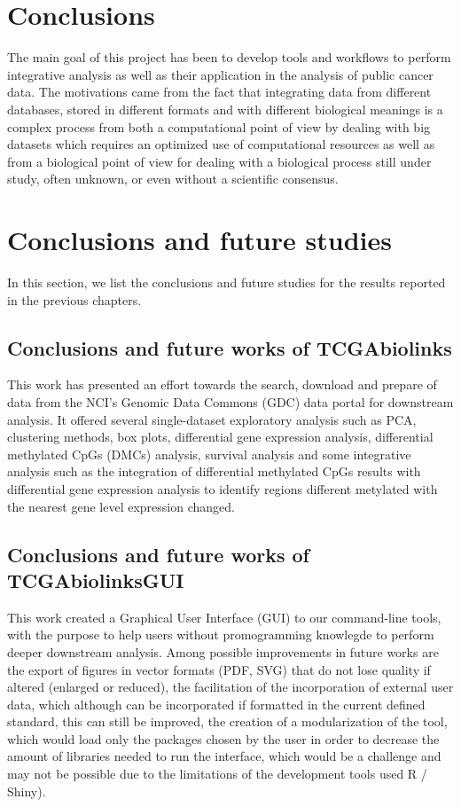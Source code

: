 \section{Conclusions}


The main goal of this project has been to develop tools and workflows to perform integrative analysis as well as their application in the analysis of public cancer data. The motivations came from the fact that integrating data from different databases, stored in different formats and with different biological meanings is a complex process from both a computational point of view by dealing with big datasets which requires an optimized use of computational resources as well as from a biological point of view for dealing with a biological process still under study, often unknown, or even without a scientific consensus.

\section{Conclusions and future studies}

In this section, we list the conclusions and future studies for the results reported in the previous chapters.

\subsection{Conclusions and future works of TCGAbiolinks}

This work has presented an effort towards the search, download and
prepare of data from the NCI's Genomic Data Commons (GDC) data portal for
downstream analysis. It offered several single-dataset
exploratory analysis such as PCA, clustering methods, box plots,
 differential gene expression analysis, differential methylated CpGs (DMCs) analysis,
 survival analysis and some integrative analysis
 such as the integration of differential methylated CpGs results with  differential gene expression analysis
 to identify regions different metylated with the nearest gene level expression changed.


\subsection{Conclusions and future works of TCGAbiolinksGUI}

This work created a Graphical User Interface (GUI) to our command-line tools,
with the purpose to help users without promogramming knowlegde to perform
deeper downstream analysis. Among possible improvements in future works are
the export of figures in vector formats (PDF, SVG) that do not lose quality
if altered (enlarged or reduced), the facilitation of the incorporation of external
user data, which although can be incorporated if formatted in the current defined standard,
this can still be improved, the creation of a modularization of the tool, which would load only the packages chosen by the user in order to decrease the amount of libraries needed to run the interface, which
would be a challenge and may not be possible due to the limitations of the development tools used R / Shiny).

